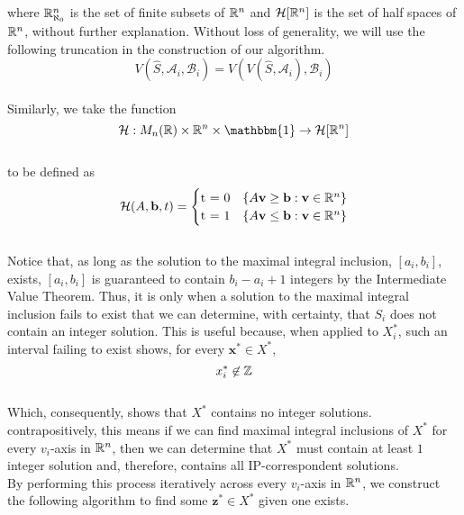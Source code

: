 \documentclass[conference]{IEEEtran}
\numberwithin{equation}{section}
\numberwithin{figure}{section}
\theoremstyle{plain}
\theoremstyle{definition}
\newcommand{\R}{\ensuremath \mathbb{R}}
\newcommand{\Z}{\ensuremath \mathbb{Z}}
\newcommand{\1}{\ensuremath \mathbbm{1}}
\newcommand{\Half}{\ensuremath \mathcal{H}}
\begin{document}
where $\R^n_{\aleph_0}$ is the set of finite subsets of $\R^n$ and $\Half[\R^n]$ 
is the set of half spaces of $\R^n$, without further explanation. Without loss of 
generality, we will use the following truncation in the construction of our 
algorithm. \\
\[V(\hat{S},\mathcal{A}_i,\mathcal{B}_i) = V(V(\hat{S},\mathcal{A}_i),\mathcal{B}_i)\] \\ 
Similarly, we take the function \\
\[\Half: M_{n}(\R) \times \R^n \times \1 \to \Half[\R^n]\] \\
to be defined as \\
\[\Half(A,\mathbf{b},t) = \begin{cases}
  $t = 0$ & \{A\mathbf{v} \geq \mathbf{b} : \mathbf{v} \in \R^n\} \\
  $t = 1$ & \{A\mathbf{v} \leq \mathbf{b} : \mathbf{v} \in \R^n\} \\
\end{cases}\] \\
\hfill \break
Notice that, as long as the solution to the maximal integral inclusion, $[a_i,
b_i]$, exists, $[a_i,b_i]$ is guaranteed to contain $b_i - a_i + 1$ integers by 
the Intermediate Value Theorem. Thus, it is only when a solution to the maximal 
integral inclusion fails to exist that we can determine, with certainty, that 
$S_i$ does not contain an integer solution. This is useful because, when applied 
to $X^*_i$, such an interval failing to exist shows, for every $\mathbf{x}^* \in 
X^*$, \\
\[x^*_i \not \in \Z\] \\
Which, consequently, shows that $X^*$ contains no integer solutions. 
contrapositively, this means if we can find maximal integral inclusions of $X^*$ 
for every $v_i$-axis in $\R^n$, then we can determine that $X^*$ must contain at 
least $1$ integer solution and, therefore, contains all IP-correspondent 
solutions. \\ \hfill \break
By performing this process iteratively across every $v_i$-axis in $\R^n$, we 
construct the following algorithm to find some $\mathbf{z}^* \in X^*$ given one 
exists. \\
\end{document}
